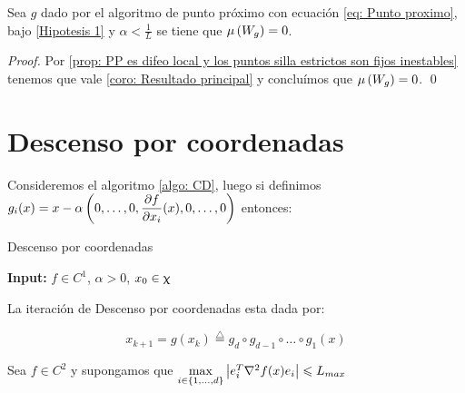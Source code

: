 \begin{corollary}
	\label{coro: PP converge a minimos}
	Sea $g$ dado por el algoritmo de punto pr\'oximo con ecuaci\'on \ref{eq: Punto proximo}, bajo \ref{Hipotesis 1} y $\alpha < \frac{1}{L}$ se tiene que $\mu\left(W_g\right) = 0$.
\end{corollary}

\begin{proof}
	Por \ref{prop: PP es difeo local y los puntos silla estrictos son fijos inestables} tenemos que vale \ref{coro: Resultado principal} y conclu\'imos que $\mu \left(W_g\right) = 0$. \qed
\end{proof}

\section{Descenso por coordenadas}

Consideremos el algoritmo \ref{algo: CD}, luego si definimos $g_i(x) = x - \alpha \left(0, \dots, 0, \dfrac{\partial f}{\partial x_i}(x), 0, \dots, 0\right)$ entonces:

\LinesNumbered
\begin{algorithm}[ht]
	\caption{Descenso por coordenadas\label{algo: CD}}
	\textbf{Input:} $f \in C^1$, $\alpha >0$, $x_0 \in \upchi$ \\
\end{algorithm}

\begin{lemma}
	La iteraci\'on de Descenso por coordenadas esta dada por:
	
	\begin{equation}
		\label{eq: DC}
		x_{k+1} = g(x_k) \stackrel{\triangle}{=} g_d \circ g_{d-1} \circ \dots \circ g_1(x)
	\end{equation}
	
\end{lemma}

\begin{remark}
	\label{Hipotesis 2}
	Sea $f \in C^2$ y supongamos que $\max\limits_{i \in \left\lbrace1, \dots, d\right\rbrace}{\left\lvert e_{i}^{T}\nabla ^2 f(x) e_i\right\rvert} \leqslant L_{max}$
\end{remark}

